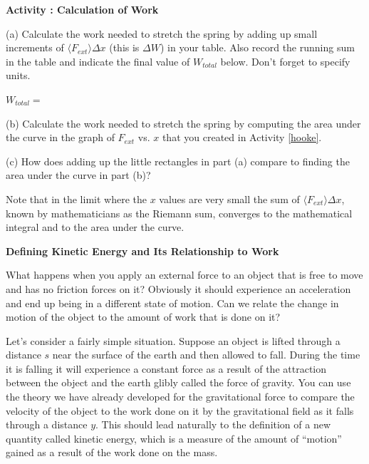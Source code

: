 \textbf{Activity  : Calculation of Work }

(a) Calculate the work needed to stretch the spring by adding up small increments of 
\( \langle F_{ext} \rangle \Delta  x\) (this is \( \Delta W\)) in your table. 
Also record the running sum in the table and indicate the final value of \( W_{total} \) below. 
Don't forget to specify units.
\vspace{5mm}

\( W_{total} =\) 
\vspace{5mm}

(b) Calculate the work needed to stretch the spring by computing the area under
the curve in the graph of \( F_{ext} \) vs. $x$ that you created in Activity \ref{hooke}.
\vspace{20mm}

\newpage

(c) How does adding up the little rectangles in part (a) compare to finding
the area under the curve in part (b)? 
\vspace{20mm}

Note that in the limit where the $x$ values are very small the sum of 
\(\langle F_{ext} \rangle
\Delta  x\), known by mathematicians as the Riemann sum, converges to the
mathematical integral and to the area under the curve.

\textbf{Defining Kinetic Energy and Its Relationship to Work} 

What happens when you apply an external force to an object that is free to move
and has no friction forces on it? Obviously it should experience an acceleration
and end up being in a different state of motion. Can we relate the change in
motion of the object to the amount of work that is done on it?

Let's consider a fairly simple situation. Suppose an object is lifted through
a distance $s$ near the surface of the earth and then allowed to fall. During
the time it is falling it will experience a constant force as a result of the
attraction between the object and the earth glibly called the force of gravity.
You can use the theory we have already developed for the gravitational force
to compare the velocity of the object to the work done on it by the gravitational
field as it falls through a distance 
$y$. This should lead naturally to the definition
of a new quantity called kinetic energy, which is a measure of the amount of
``motion'' gained as a result of the work done on the mass. 

